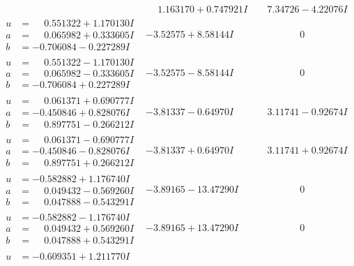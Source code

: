 \documentclass[1p]{elsarticle_modified}
\theoremstyle{definition}
\begin{document}
$$\begin{array}{c|c|c}
 & \phantom{-}1.163170 + 0.747921 I & \phantom{-}7.34726 - 4.22076 I \\ \hline\begin{aligned}
u &= \phantom{-}0.551322 + 1.170130 I \\
a &= \phantom{-}0.065982 + 0.333605 I \\
b &= -0.706084 - 0.227289 I\end{aligned}
 & -3.52575 + 8.58144 I & \phantom{-0.000000 } 0 \\ \hline\begin{aligned}
u &= \phantom{-}0.551322 - 1.170130 I \\
a &= \phantom{-}0.065982 - 0.333605 I \\
b &= -0.706084 + 0.227289 I\end{aligned}
 & -3.52575 - 8.58144 I & \phantom{-0.000000 } 0 \\ \hline\begin{aligned}
u &= \phantom{-}0.061371 + 0.690777 I \\
a &= -0.450846 + 0.828076 I \\
b &= \phantom{-}0.897751 - 0.266212 I\end{aligned}
 & -3.81337 - 0.64970 I & \phantom{-}3.11741 - 0.92674 I \\ \hline\begin{aligned}
u &= \phantom{-}0.061371 - 0.690777 I \\
a &= -0.450846 - 0.828076 I \\
b &= \phantom{-}0.897751 + 0.266212 I\end{aligned}
 & -3.81337 + 0.64970 I & \phantom{-}3.11741 + 0.92674 I \\ \hline\begin{aligned}
u &= -0.582882 + 1.176740 I \\
a &= \phantom{-}0.049432 - 0.569260 I \\
b &= \phantom{-}0.047888 - 0.543291 I\end{aligned}
 & -3.89165 - 13.47290 I & \phantom{-0.000000 } 0 \\ \hline\begin{aligned}
u &= -0.582882 - 1.176740 I \\
a &= \phantom{-}0.049432 + 0.569260 I \\
b &= \phantom{-}0.047888 + 0.543291 I\end{aligned}
 & -3.89165 + 13.47290 I & \phantom{-0.000000 } 0 \\ \hline\begin{aligned}
u &= -0.609351 + 1.211770 I \\

\end{aligned}
\end{array}$$
\end{document}

